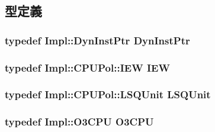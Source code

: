\subsection{型定義}
\hypertarget{classLSQ_a028ce10889c5f6450239d9e9a7347976}{
\subsubsection[{DynInstPtr}]{\setlength{\rightskip}{0pt plus 5cm}typedef Impl::DynInstPtr {\bf DynInstPtr}}}
\label{classLSQ_a028ce10889c5f6450239d9e9a7347976}
\hypertarget{classLSQ_a23f60a4095b5240dfcb18a4ec40210a9}{
\subsubsection[{IEW}]{\setlength{\rightskip}{0pt plus 5cm}typedef Impl::CPUPol::IEW {\bf IEW}}}
\label{classLSQ_a23f60a4095b5240dfcb18a4ec40210a9}
\hypertarget{classLSQ_a978eac36269e7f814c4b396c9e4bf51e}{
\subsubsection[{LSQUnit}]{\setlength{\rightskip}{0pt plus 5cm}typedef Impl::CPUPol::LSQUnit {\bf LSQUnit}}}
\label{classLSQ_a978eac36269e7f814c4b396c9e4bf51e}
\hypertarget{classLSQ_a44622cf06940413482836cb62931ac3f}{
\subsubsection[{O3CPU}]{\setlength{\rightskip}{0pt plus 5cm}typedef Impl::O3CPU {\bf O3CPU}}}
\label{classLSQ_a44622cf06940413482836cb62931ac3f}


